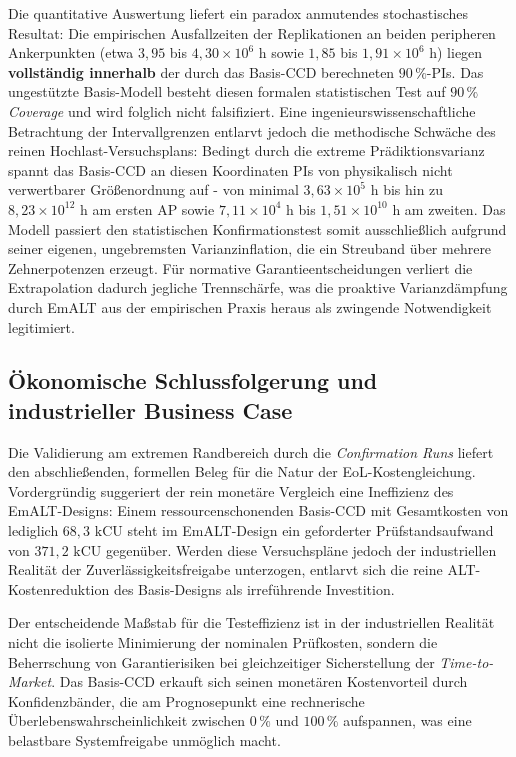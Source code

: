 Die quantitative Auswertung liefert ein paradox anmutendes stochastisches Resultat:
Die empirischen Ausfallzeiten der Replikationen an beiden peripheren Ankerpunkten (etwa $3{,}95$ bis $4{,}30\times 10^6\text{ h}$ sowie $1{,}85$ bis $1{,}91\times 10^6\text{ h}$) liegen \textbf{vollständig innerhalb} der durch das Basis-\ac{CCD} berechneten $90\,\%$-\acp{PI}.
Das ungestützte Basis-Modell besteht diesen formalen statistischen Test auf $90\,\%$ \textit{Coverage} und wird folglich nicht falsifiziert.
Eine ingenieurswissenschaftliche Betrachtung der Intervallgrenzen entlarvt jedoch die methodische Schwäche des reinen Hochlast-Versuchsplans:
Bedingt durch die extreme Prädiktionsvarianz spannt das Basis-\ac{CCD} an diesen Koordinaten \acp{PI} von physikalisch nicht verwertbarer Größenordnung auf - von minimal $3{,}63\times 10^5\text{ h}$ bis hin zu $8{,}23\times 10^{12}\text{ h}$ am ersten \ac{AP} sowie $7{,}11\times 10^4\text{ h}$ bis $1{,}51\times 10^{10}\text{ h}$ am zweiten.
Das Modell passiert den statistischen Konfirmationstest somit ausschließlich aufgrund seiner eigenen, ungebremsten Varianzinflation, die ein Streuband über mehrere Zehnerpotenzen erzeugt.
Für normative Garantieentscheidungen verliert die Extrapolation dadurch jegliche Trennschärfe, was die proaktive Varianzdämpfung durch \ac{EmALT} aus der empirischen Praxis heraus als zwingende Notwendigkeit legitimiert.

\subsection{Ökonomische Schlussfolgerung und industrieller Business Case} \label{subsec:oekonomische_schlussfolgerung}

Die Validierung am extremen Randbereich durch die \textit{Confirmation Runs} liefert den abschließenden, formellen Beleg für die Natur der \ac{EoL}-Kostengleichung.
Vordergründig suggeriert der rein monetäre Vergleich eine Ineffizienz des \ac{EmALT}-Designs: Einem ressourcenschonenden Basis-\ac{CCD} mit Gesamtkosten von lediglich $68{,}3\text{ kCU}$ steht im \ac{EmALT}-Design ein geforderter Prüfstandsaufwand von $371{,}2\text{ kCU}$ gegenüber.
Werden diese Versuchspläne jedoch der industriellen Realität der Zuverlässigkeitsfreigabe unterzogen, entlarvt sich die reine \ac{ALT}-Kostenreduktion des Basis-Designs als irreführende Investition.

Der entscheidende Maßstab für die Testeffizienz ist in der industriellen Realität nicht die isolierte Minimierung der nominalen Prüfkosten, sondern die Beherrschung von Garantierisiken bei gleichzeitiger Sicherstellung der \textit{Time-to-Market}.
Das Basis-\ac{CCD} erkauft sich seinen monetären Kostenvorteil durch Konfidenzbänder, die am Prognosepunkt eine rechnerische Überlebenswahrscheinlichkeit zwischen $0\,\%$ und $100\,\%$ aufspannen, was eine belastbare Systemfreigabe unmöglich macht.

